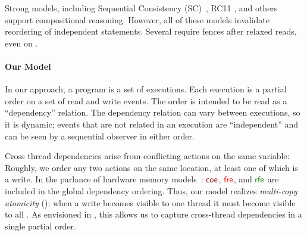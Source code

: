 

Strong models, including Sequential Consistency
(SC)~\citep{Lamport:1979:MMC:1311099.1311750}, RC11
\citep{DBLP:conf/pldi/LahavVKHD17}, and others
\citep{Dolan:2018:BDR:3192366.3192421,DBLP:conf/pldi/LahavVKHD17,DBLP:conf/lics/JeffreyR16,Boehm:2014:OGA:2618128.2618134}
support compositional reasoning.  However, all of these models invalidate
reordering of independent statements.  Several require fences after relaxed
reads, even on \armeight.


\paragraph{Our Model}

In our approach, a program is a set of executions.  Each execution is a
partial order on a set of read and write events.  The order is intended to be
read as a ``dependency'' relation.  The dependency relation can vary between
executions, so it is dynamic; events that are not related in an execution are
``independent'' and can be seen by a sequential observer in either order.

Cross thread dependencies arise from conflicting actions on the same
variable: Roughly, we order any two actions on the same location, at least
one of which is a write.  In the parlance of hardware memory
models~\citep{alglave}: $\rcoe$, $\rfre$, and $\rrfex$ are included in the
global dependency ordering.  Thus, our model realizes \emph{multi-copy
  atomicity} (\mca): when a write becomes visible to one thread it must
become visible to all
\citep{DBLP:journals/pacmpl/PulteFDFSS18}.  As envisioned in
\cite[]{AlglaveThesis}, this allows us to capture cross-thread
dependencies in a single partial order.

